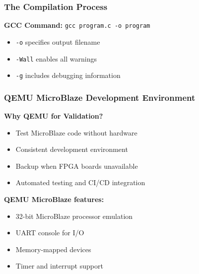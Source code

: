 \documentclass{beamer}
\begin{document}
\begin{frame}
\frametitle{The Compilation Process}
\begin{center}
\end{center}

\textbf{GCC Command:} \texttt{gcc program.c -o program}
\begin{itemize}
    \item \texttt{-o} specifies output filename
    \item \texttt{-Wall} enables all warnings
    \item \texttt{-g} includes debugging information
\end{itemize}
\end{frame}

\begin{frame}
\frametitle{QEMU MicroBlaze Development Environment}
\textbf{Why QEMU for Validation?}
\begin{itemize}
    \item Test MicroBlaze code without hardware
    \item Consistent development environment
    \item Backup when FPGA boards unavailable
    \item Automated testing and CI/CD integration
\end{itemize}

\vspace{0.5cm}
\textbf{QEMU MicroBlaze features:}
\begin{itemize}
    \item 32-bit MicroBlaze processor emulation
    \item UART console for I/O
    \item Memory-mapped devices
    \item Timer and interrupt support
\end{itemize}
\end{frame}
\end{document}
